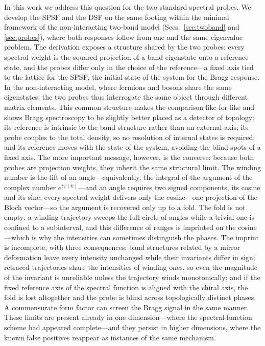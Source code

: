 \documentclass[onecolumn,aps,prl,superscriptaddress,longbibliography]{revtex4-2}
\begin{document}
In this work we address this question for the two standard spectral probes. We develop the SPSF and the DSF on the same footing within the minimal framework of the non-interacting two-band model (Secs.~\ref{sec:twoband} and \ref{sec:probes}), where both responses follow from one and the same eigenvalue problem. The derivation exposes a structure shared by the two probes: every spectral weight is the squared projection of a band eigenstate onto a reference state, and the probes differ only in the choice of the reference---a fixed axis tied to the lattice for the SPSF, the initial state of the system for the Bragg response. In the non-interacting model, where fermions and bosons share the same eigenstates, the two probes thus interrogate the same object through different matrix elements. This common structure makes the comparison like-for-like and shows Bragg spectroscopy to be slightly better placed as a detector of topology: its reference is intrinsic to the band structure rather than an external axis; its probe couples to the total density, so no resolution of internal states is required; and its reference moves with the state of the system, avoiding the blind spots of a fixed axis. The more important message, however, is the converse: because both probes are projection weights, they inherit the same structural limit. The winding number is the lift of an angle---equivalently, the integral of the argument of the complex number $e^{i\psi(k)}$---and an angle requires two signed components, its cosine and its sine; every spectral weight delivers only the cosine---one projection of the Bloch vector---so the argument is recovered only up to a fold. The fold is not empty: a winding trajectory sweeps the full circle of angles while a trivial one is confined to a subinterval, and this difference of ranges is imprinted on the cosine---which is why the intensities can sometimes distinguish the phases. The imprint is incomplete, with three consequences: band structures related by a mirror deformation leave every intensity unchanged while their invariants differ in sign; retraced trajectories share the intensities of winding ones, so even the magnitude of the invariant is unreliable unless the trajectory winds monotonically; and if the fixed reference axis of the spectral function is aligned with the chiral axis, the fold is lost altogether and the probe is blind across topologically distinct phases. A commensurate form factor can screen the Bragg signal in the same manner. These limits are present already in one dimension---where the spectral-function scheme had appeared complete---and they persist in higher dimensions, where the known false positives reappear as instances of the same mechanism.
\end{document}
